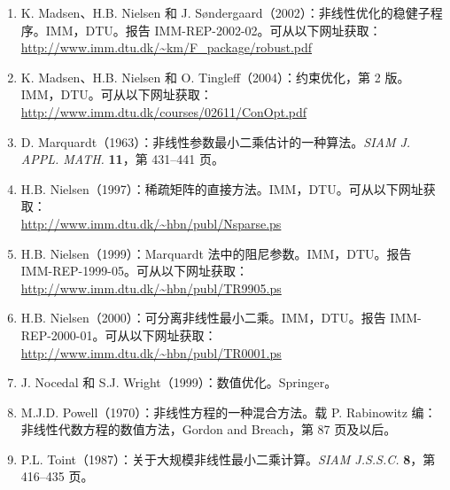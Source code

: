 \begin{enumerate}[label={\arabic*.},leftmargin=2.3em,itemsep=0.6em,start=12]
 \item K. Madsen、H.B. Nielsen 和 J. Søndergaard（2002）：非线性优化的稳健子程序。IMM，DTU。报告 IMM-REP-2002-02。可从以下网址获取：\\
 \url{http://www.imm.dtu.dk/~km/F_package/robust.pdf}
 \item K. Madsen、H.B. Nielsen 和 O. Tingleff（2004）：约束优化，第 2 版。IMM，DTU。可从以下网址获取：\\
 \url{http://www.imm.dtu.dk/courses/02611/ConOpt.pdf}
 \item D. Marquardt（1963）：非线性参数最小二乘估计的一种算法。\emph{SIAM J. APPL. MATH.} \textbf{11}，第 431--441 页。
 \item H.B. Nielsen（1997）：稀疏矩阵的直接方法。IMM，DTU。可从以下网址获取：\\
 \url{http://www.imm.dtu.dk/~hbn/publ/Nsparse.ps}
 \item H.B. Nielsen（1999）：Marquardt 法中的阻尼参数。IMM，DTU。报告 IMM-REP-1999-05。可从以下网址获取：\\
 \url{http://www.imm.dtu.dk/~hbn/publ/TR9905.ps}
 \item H.B. Nielsen（2000）：可分离非线性最小二乘。IMM，DTU。报告 IMM-REP-2000-01。可从以下网址获取：\\
 \url{http://www.imm.dtu.dk/~hbn/publ/TR0001.ps}
 \item J. Nocedal 和 S.J. Wright（1999）：数值优化。Springer。
 \item M.J.D. Powell（1970）：非线性方程的一种混合方法。载 P. Rabinowitz 编：非线性代数方程的数值方法，Gordon and Breach，第 87 页及以后。
 \item P.L. Toint（1987）：关于大规模非线性最小二乘计算。\emph{SIAM J.S.S.C.} \textbf{8}，第 416--435 页。
\end{enumerate}

